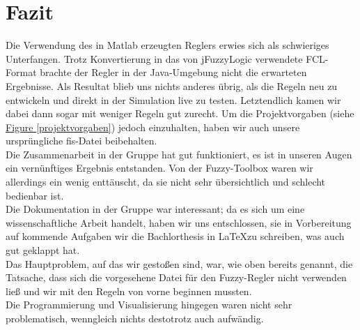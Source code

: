 \documentclass[10pt,a4paper]{article}
\begin{document}
\section{Fazit}
Die Verwendung des in Matlab erzeugten Reglers erwies sich als schwieriges Unterfangen. Trotz Konvertierung in das von jFuzzyLogic verwendete FCL-Format brachte der Regler in der Java-Umgebung nicht die erwarteten Ergebnisse. Als Resultat blieb uns nichts anderes übrig, als die Regeln neu zu entwickeln und direkt in der Simulation live zu testen. Letztendlich kamen wir dabei dann sogar mit weniger Regeln gut zurecht.
Um die Projektvorgaben (siehe \hyperref[projektvorgaben]{Figure \ref*{projektvorgaben}}) jedoch einzuhalten, haben wir auch unsere ursprüngliche fis-Datei beibehalten.\\
Die Zusammenarbeit in der Gruppe hat gut funktioniert, es ist in unseren Augen ein vernünftiges Ergebnis entstanden. Von der Fuzzy-Toolbox waren wir allerdings ein wenig enttäuscht, da sie nicht sehr übersichtlich und schlecht bedienbar ist.\\
Die Dokumentation in der Gruppe war interessant; da es sich um eine wissenschaftliche Arbeit handelt, haben wir uns entschlossen, sie in Vorbereitung auf kommende Aufgaben wir die Bachlorthesis in \LaTeX zu schreiben, was auch gut geklappt hat.\\
Das Hauptproblem, auf das wir gestoßen sind, war, wie oben bereits genannt, die Tatsache, dass sich die vorgesehene Datei für den Fuzzy-Regler nicht verwenden ließ und wir mit den Regeln von vorne beginnen mussten.\\
Die Programmierung und Visualisierung hingegen waren nicht sehr problematisch, wenngleich nichts destotrotz auch aufwändig.
\end{document}
